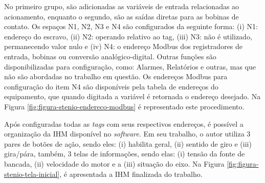 No primeiro grupo, são adicionadas as variáveis de entrada relacionadas ao acionamento, enquanto o segundo, são as saídas diretas para as bobinas de contato. Os espaços N1, N2, N3 e N4 são configurados da seguinte forma: (i) N1: endereço do escravo, (ii) N2: operando relativo ao tag, (iii) N3: não é utilizado, permanecendo valor nulo e (iv) N4: o endereço Modbus dos registradores de entrada, bobinas ou conversão analógico-digital.
\newpage
Outras funções são disponibilizadas para configuração, como: Alarmes, Relatórios e outras, mas que não são abordadas no trabalho em questão. Os endereços Modbus para configuração do item N4 são disponíveis pela tabela de endereços do equipamento, que quando digitada a variável é retornada o endereço desejado. Na Figura \ref{fig:figura-stenio-endereco-modbus} é representado este procedimento.
    	
        \begin{figure}[!h]
    	\end{figure}

 Após configuradas todas as \textit{tags} com seus respectivos endereços, é possível a organização da \gls{IHM} disponível no \textit{software}. Em seu trabalho, o autor utiliza 3 pares de botões de ação, sendo eles: (i) habilita geral, (ii) sentido de giro e (iii) gira/pára, também, 3 telas de informações, sendo elas: (i) tensão da fonte de bancada, (ii) velocidade do motor e a (iii) situação do eixo. Na Figura \ref{fig:figura-stenio-tela-inicial}, é apresentada a \gls{IHM} finalizada do trabalho.
    	
        \begin{figure}[!h]
    	\end{figure}
    	
